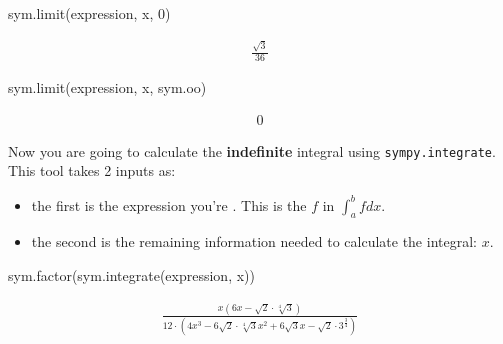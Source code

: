 \begin{pyin}
sym.limit(expression, x, 0)
\end{pyin}




\begin{equation*}
\begin{split}\displaystyle \frac{\sqrt{3}}{36}\end{split}
\end{equation*}






\begin{pyin}
sym.limit(expression, x, sym.oo)
\end{pyin}




\begin{equation*}
\begin{split}\displaystyle 0\end{split}
\end{equation*}




Now you are going to calculate the \textbf{indefinite} integral using
\texttt{sympy.integrate}. This tool takes 2 inputs as:
\begin{itemize}
\item 

the first is the expression you’re . This is the \(f\) in \(\int_a^b f
dx\).

\item 

the second is the remaining information needed to calculate the integral: \(x\).

\end{itemize}




\begin{pyin}
sym.factor(sym.integrate(expression, x))
\end{pyin}




\begin{equation*}
\begin{split}\displaystyle \frac{x \left(6 x - \sqrt{2} \cdot \sqrt[4]{3}\right)}{12 \cdot \left(4 x^{3} - 6 \sqrt{2} \cdot \sqrt[4]{3} x^{2} + 6 \sqrt{3} x - \sqrt{2} \cdot 3^{\frac{3}{4}}\right)}\end{split}
\end{equation*}




